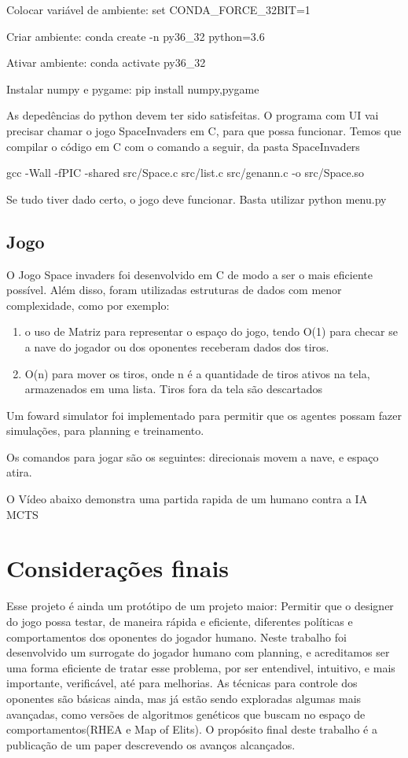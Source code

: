 \documentclass[]{book}
\begin{document}
Colocar variável de ambiente: set CONDA\_FORCE\_32BIT=1

Criar ambiente: conda create -n py36\_32 python=3.6

Ativar ambiente: conda activate py36\_32

Instalar numpy e pygame: pip install numpy,pygame

As depedências do python devem ter sido satisfeitas. O programa com UI
vai precisar chamar o jogo SpaceInvaders em C, para que possa funcionar.
Temos que compilar o código em C com o comando a seguir, da pasta
SpaceInvaders

gcc -Wall -fPIC -shared src/Space.c src/list.c src/genann.c -o
src/Space.so

Se tudo tiver dado certo, o jogo deve funcionar. Basta utilizar python
menu.py

\section{Jogo}\label{jogo}

O Jogo Space invaders foi desenvolvido em C de modo a ser o mais
eficiente possível. Além disso, foram utilizadas estruturas de dados com
menor complexidade, como por exemplo:

\begin{enumerate}
\def\labelenumi{\arabic{enumi}.}
\item
  o uso de Matriz para representar o espaço do jogo, tendo O(1) para
  checar se a nave do jogador ou dos oponentes receberam dados dos
  tiros.
\item
  O(n) para mover os tiros, onde n é a quantidade de tiros ativos na
  tela, armazenados em uma lista. Tiros fora da tela são descartados
\end{enumerate}

Um foward simulator foi implementado para permitir que os agentes possam
fazer simulações, para planning e treinamento.

Os comandos para jogar são os seguintes: direcionais movem a nave, e
espaço atira.

O Vídeo abaixo demonstra uma partida rapida de um humano contra a IA
MCTS

\chapter{Considerações finais}\label{considerauxe7uxf5es-finais}

Esse projeto é ainda um protótipo de um projeto maior: Permitir que o
designer do jogo possa testar, de maneira rápida e eficiente, diferentes
políticas e comportamentos dos oponentes do jogador humano. Neste
trabalho foi desenvolvido um surrogate do jogador humano com planning, e
acreditamos ser uma forma eficiente de tratar esse problema, por ser
entendivel, intuitivo, e mais importante, verificável, até para
melhorias. As técnicas para controle dos oponentes são básicas ainda,
mas já estão sendo exploradas algumas mais avançadas, como versões de
algoritmos genéticos que buscam no espaço de comportamentos(RHEA e Map
of Elits). O propósito final deste trabalho é a publicação de um paper
descrevendo os avanços alcançados.


\end{document}
